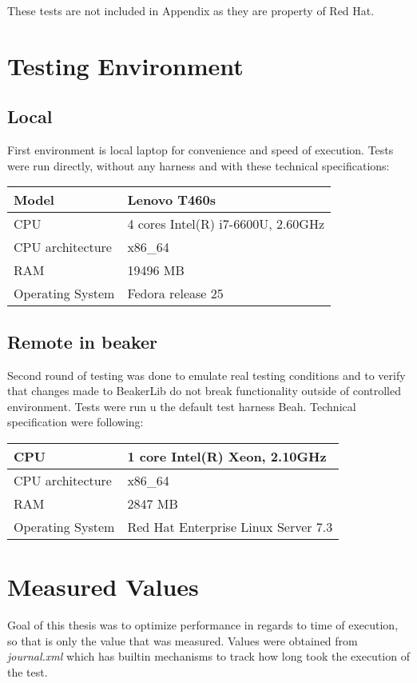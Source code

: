 These tests are not included in Appendix as they are property of Red Hat.

\section{Testing Environment}

\subsection{Local}
First environment is local laptop for convenience and speed of execution. Tests were run directly, without any harness and with these technical specifications:  %

\begin{center}
    \begin{tabular}{| l | l |}
    \hline
    Model & Lenovo T460s \\ \hline
    CPU & 4 cores Intel(R) i7-6600U, 2.60GHz \\ \hline
    CPU architecture & x86\_64 \\ \hline
    RAM & 19496 MB   \\ \hline
    Operating System & Fedora release 25 \\ \hline
    \end{tabular}
\end{center}

\subsection{Remote in beaker}
Second round of testing was done to emulate real testing conditions and to verify that changes made to BeakerLib do not break functionality outside of controlled environment. Tests were run u the default test harness Beah. Technical specification were following:

\begin{center}
    \begin{tabular}{| l | l |}
    \hline
    CPU & 1 core Intel(R) Xeon, 2.10GHz \\ \hline
    CPU architecture & x86\_64 \\ \hline
    RAM & 2847 MB   \\ \hline
    Operating System & Red Hat Enterprise Linux Server 7.3 \\ \hline
    \end{tabular}
\end{center}


\section{Measured Values} %
Goal of this thesis was to optimize performance in regards to time of execution, so that is only the value that was measured. Values were obtained from \textit{journal.xml} which has builtin mechanisms to track how long took the execution of the test.

